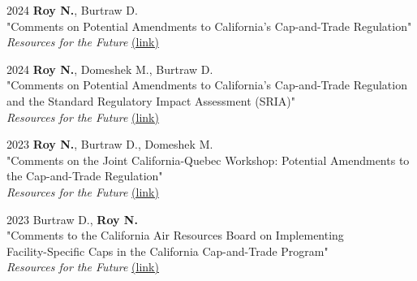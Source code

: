 \documentclass[margin]{res}
\begin{document}
\begin{resume}
2024 \hspace{4mm}%
    \textbf{Roy N.}, Burtraw D. \\
    \hspace*{16mm} "Comments on Potential Amendments to California's Cap-and-Trade Regulation" \\
    \hspace*{16mm}  \textit{Resources for the Future}   \href{https://www.rff.org/publications/testimony-and-public-comments/comments-on-potential-amendments-to-californias-cap-and-trade-regulation/} {(link)}

2024 \hspace{4mm}%
    \textbf{Roy N.}, Domeshek M., Burtraw D.\\
    \hspace*{16mm} "Comments on Potential Amendments to California's Cap-and-Trade Regulation \\ 
    \hspace*{16mm} and the Standard Regulatory Impact Assessment (SRIA)" \\
    \hspace*{16mm}  \textit{Resources for the Future}   \href{https://www.rff.org/publications/testimony-and-public-comments/comments-on-potential-amendments-to-californias-cap-and-trade-regulation-and-the-standardized-regulatory-impact-assessment/} {(link)}

2023 \hspace{4mm}%
    \textbf{Roy N.}, Burtraw D., Domeshek M.\\
    \hspace*{16mm} "Comments on the Joint California-Quebec Workshop:  Potential Amendments to \\
    \hspace*{16mm}  the Cap-and-Trade Regulation" \\
    \hspace*{16mm}  \textit{Resources for the Future}   \href{https://media.rff.org/documents/231215_CommentsCARB-RFF_rev.pdf} {(link)}
    
2023 \hspace{4mm}%
    Burtraw D., \textbf{Roy N.} \\
    \hspace*{16mm}  "Comments to the California Air Resources Board on Implementing \\
    \hspace*{16mm}  Facility-Specific Caps in the California Cap-and-Trade Program" \\
    \hspace*{16mm}  \textit{Resources for the Future}   \href{https://www.rff.org/publications/testimony-and-public-comments/comments-to-the-california-air-resources-board-on-implementing-facility-specific-caps-in-the-california-cap-and-trade-program/} {(link)}
    

\end{resume}
\end{document}
